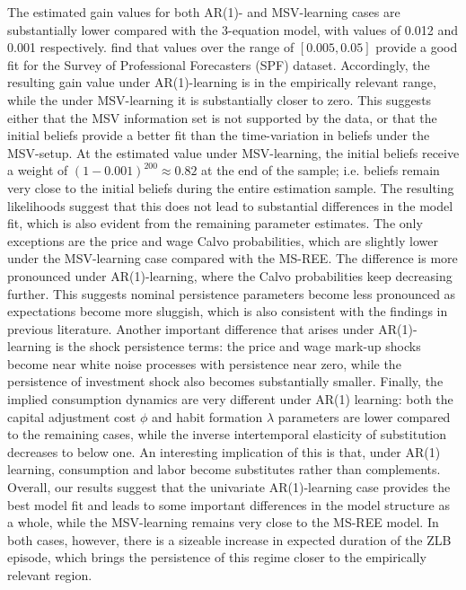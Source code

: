 \documentclass[12pt,reqno]{article}
\numberwithin{equation}{section}
\begin{document}
The estimated gain values for both AR(1)- and MSV-learning cases are substantially lower compared with the 3-equation model, with values of 0.012 and 0.001 respectively. \cite{branch2006simple} find that values over the range of $[0.005,0.05]$ provide a good fit for the Survey of Professional Forecasters (SPF) dataset. Accordingly, the resulting gain value under AR(1)-learning is in the empirically relevant range, while the under MSV-learning it is substantially closer to zero. This suggests either that the MSV information set is not supported by the data, or that the initial beliefs provide a better fit than the time-variation in beliefs under the MSV-setup. At the estimated value under MSV-learning, the initial beliefs receive a weight of $(1-0.001)^200 \approx 0.82$ at the end of the sample; i.e. beliefs remain very close to the initial beliefs during the entire estimation sample. The resulting likelihoods suggest that this does not lead to substantial differences in the model fit, which is also evident from the remaining parameter estimates. The only exceptions are the price and wage Calvo probabilities, which are slightly lower under the MSV-learning case compared with the MS-REE. The difference is more pronounced under AR(1)-learning, where the Calvo probabilities keep decreasing further. This suggests nominal persistence parameters become less pronounced as expectations become more sluggish, which is also consistent with the findings in previous literature. Another important difference that arises under AR(1)-learning is the shock persistence terms: the price and wage mark-up shocks become near white noise processes with persistence near zero, while the persistence of investment shock also becomes substantially smaller. Finally, the implied consumption dynamics are very different under AR(1) learning: both the capital adjustment cost $\phi$ and habit formation $\lambda$ parameters are lower compared to the remaining cases, while the inverse intertemporal elasticity of substitution decreases to below one. An interesting implication of this is that, under AR(1) learning, consumption and labor become substitutes rather than complements. \\
\noindent
Overall, our results suggest that the univariate AR(1)-learning case provides the best model fit and leads to some important differences in the model structure as a whole, while the MSV-learning remains very close to the MS-REE model. In both cases, however, there is a sizeable increase in expected duration of the ZLB episode, which brings the persistence of this regime closer to the empirically relevant region. \\
\noindent
\end{document}

